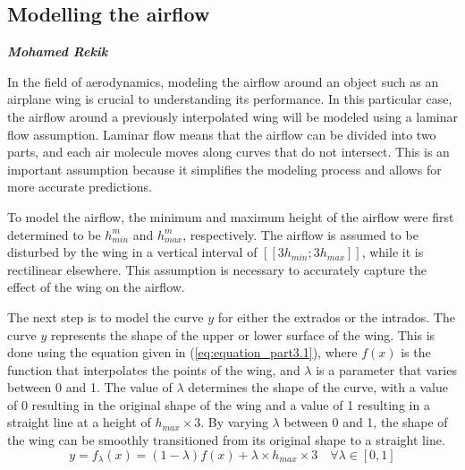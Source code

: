 \subsection{Modelling the airflow}
\large \emph{\textbf{Mohamed Rekik}}

In the field of aerodynamics, modeling the airflow around an object such as an airplane wing is crucial to understanding its performance. In this particular case, the airflow around a previously interpolated wing will be modeled using a laminar flow assumption. Laminar flow means that the airflow can be divided into two parts, and each air molecule moves along curves that do not intersect. This is an important assumption because it simplifies the modeling process and allows for more accurate predictions.

To model the airflow, the minimum and maximum height of the airflow were first determined to be $h_{min}^{m}$ and $h_{max}^{m}$, respectively. The airflow is assumed to be disturbed by the wing in a vertical interval of $[[3h_{min}; 3h_{max}]]$, while it is rectilinear elsewhere. This assumption is necessary to accurately capture the effect of the wing on the airflow.

The next step is to model the curve $y$ for either the extrados or the intrados. The curve $y$ represents the shape of the upper or lower surface of the wing. This is done using the equation given in (\ref{eq:equation_part3.1}), where $f(x)$ is the function that interpolates the points of the wing, and $\lambda$ is a parameter that varies between 0 and 1. The value of $\lambda$ determines the shape of the curve, with a value of 0 resulting in the original shape of the wing and a value of 1 resulting in a straight line at a height of $h_{max}\times 3$. By varying $\lambda$ between 0 and 1, the shape of the wing can be smoothly transitioned from its original shape to a straight line.
\begin{equation}
  \label{eq:equation_part3.1}
  y = f_{\lambda}(x) = (1 - \lambda)f(x) + \lambda \times h_{max} \times 3 \quad \forall \lambda \in [0,1] 
\end{equation}

